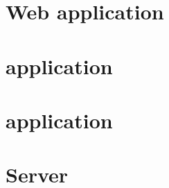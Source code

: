 %

\section{Web application}

\FloatBarrier

\section{ application}

\FloatBarrier

\section{ application}

\FloatBarrier

\section{Server}



%

%
